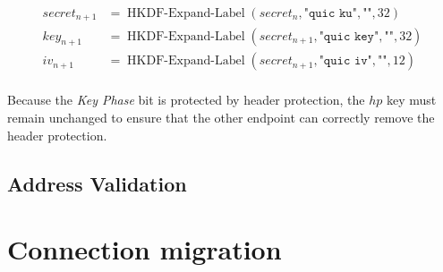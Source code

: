 \begin{equation*}
  \begin{split}
  secret_{n+1} & = \operatorname{HKDF-Expand-Label}(secret_{n}, \texttt{"quic ku"}, \texttt{""}, 32) \\
  key_{n+1} & = \operatorname{HKDF-Expand-Label}(secret_{n+1}, \texttt{"quic key"}, \texttt{""}, 32) \\
  iv_{n+1}  & = \operatorname{HKDF-Expand-Label}(secret_{n+1}, \texttt{"quic iv"}, \texttt{""}, 12)  \\
  \end{split}
\end{equation*}

Because the \textit{Key Phase} bit is protected by header protection, the $hp$ key must remain
unchanged to ensure that the other endpoint can correctly remove the header protection.

\subsection{Address Validation}

\section{Connection migration}
